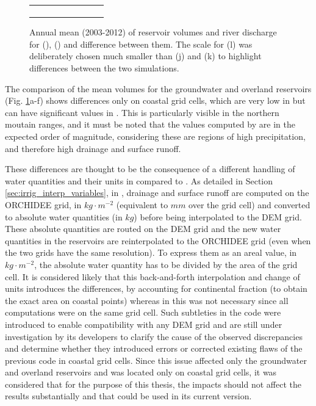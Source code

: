 \begin{figure}[htbp]
\begin{tabular}{ccc}
\begin{subfigure}[b]{0.33\textwidth}
        \end{subfigure} \\
    \end{tabular}
    \caption{Annual mean (2003-2012) of reservoir volumes and river discharge for \std (\noirr), \native (\noirr) and difference between them. 
    The scale for (l) was deliberately chosen much smaller than (j) and (k) to highlight differences between the two simulations.}
    \label{fig:routing_reservoirs_halfdeg}
\end{figure}

The comparison of the mean volumes for the groundwater and overland reservoirs (Fig. \ref{fig:routing_reservoirs_halfdeg}a-f) shows differences only on coastal grid cells, which are very low in \std but can have significant values in \native. This is particularly visible in the northern moutain ranges, and it must be noted that the values computed by \native are in the expected order of magnitude, considering these are regions of high precipitation, and therefore high drainage and surface runoff.

These differences are thought to be the consequence of a different handling of water quantities and their units in \native compared to \std. 
As detailed in Section \ref{sec:irrig_interp_variables}, in \native, drainage and surface runoff are computed on the ORCHIDEE grid, in $kg \cdot m^{-2}$ (equivalent to $mm$ over the grid cell) and converted to absolute water quantities (in $kg$) before being interpolated to the DEM grid. These absolute quantities are routed on the DEM grid and the new water quantities in the reservoirs are reinterpolated to the ORCHIDEE grid (even when the two grids have the same resolution). 
To express them as an areal value, in $kg \cdot m^{-2}$, the absolute water quantity has to be divided by the area of the grid cell. It is considered likely that this back-and-forth interpolation and change of units introduces the differences, by accounting for continental fraction (to obtain the exact area on coastal points) whereas in \std this was not necessary since all computations were on the same grid cell. Such subtleties in the code were introduced to enable compatibility with any DEM grid and are still under investigation by its developers to clarify the cause of the observed discrepancies and determine whether they introduced errors or corrected existing flaws of the previous code in coastal grid cells.
Since this issue affected only the groundwater and overland reservoirs and was located only on coastal grid cells, it was considered that for the purpose of this thesis, the impacts should not affect the results substantially and that \native could be used in its current version.

